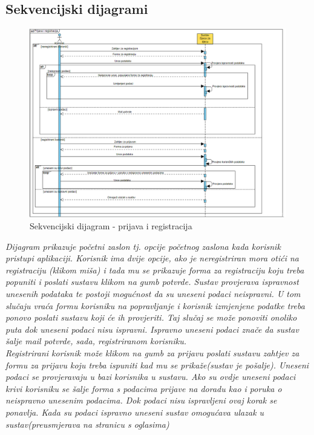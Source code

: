 			\subsection{Sekvencijski dijagrami}
				\begin{figure}[H]
						\includegraphics[width=\textwidth,height=0.7\textheight]{dijagrami/sq_d_pr_reg.png}
						\centering
						\caption{Sekvencijski dijagram - prijava i registracija}
						\label{fig:Prijava i regirtracija}
				\end{figure}
				\textit{Dijagram prikazuje početni zaslon tj. opcije početnog zaslona kada korisnik pristupi aplikaciji. Korisnik ima dvije opcije, ako je neregistriran mora otići na registraciju (klikom miša) i tada mu se prikazuje forma za registraciju koju treba popuniti i poslati sustavu klikom na gumb potvrde. Sustav provjerava ispravnost unesenih podataka te postoji mogućnost da su uneseni podaci neispravni. U tom slučaju vraća formu korisniku na popravljanje i korisnik izmjenjene podatke treba ponovo poslati sustavu koji će ih provjeriti. Taj slučaj se može ponoviti onoliko puta dok uneseni podaci nisu ispravni. Ispravno uneseni podaci znače da sustav šalje mail potvrde, sada, registriranom korisniku.\\ Registrirani korisnik može klikom na gumb za prijavu poslati sustavu zahtjev za formu za prijavu koju treba ispuniti kad mu se prikaže(sustav je pošalje). Uneseni podaci se provjeravaju u bazi korisnika u sustavu. Ako su ovdje uneseni podaci krivi korisniku se šalje forma s podacima prijave na doradu kao i poruka o neispravno unesenim podacima. Dok podaci nisu ispravljeni ovaj korak se ponavlja. Kada su podaci ispravno uneseni sustav omogućava ulazak u sustav(preusmjerava na stranicu s oglasima)}
				\newline
				
